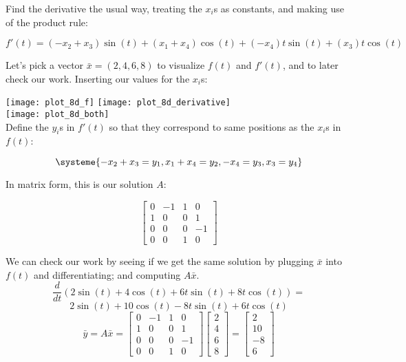 \documentclass[12pt]{article}
\begin{document}
Find the derivative the usual way, treating the $x_i$s as constants, and making use of the product
rule:

\[
f'(t) = (-x_2 + x_3)\sin(t) + (x_1 + x_4)\cos(t) + (-x_4)t\sin(t) + (x_3)t\cos(t)
\]

Let's pick a vector $\bar{x}=(2,4,6,8)$ to visualize $f(t)$ and $f'(t)$, and to later check our
work. Inserting our values for the $x_i$s:

\texttt{[image: plot\_8d\_f]} \texttt{[image: plot\_8d\_derivative]} \\
\texttt{[image: plot\_8d\_both]} \\
\newpage
Define the $y_i$s in $f'(t)$ so that they correspond to same positions as the $x_i$s in $f(t)$:

\[
\systeme{-x_2 + x_3 = y_1, x_1 + x_4 = y_2, -x_4 = y_3,x_3 = y_4}
\]

In matrix form, this is our solution $A$:

\[
\begin{bmatrix}
  0 & -1 & 1 & 0 \\
  1 & 0 & 0 & 1 \\
  0 & 0 & 0 & -1 \\
  0 & 0 & 1 & 0 
\end{bmatrix}
\]

We can check our work by seeing if we get the same solution by plugging
$\bar{x}$ into $f(t)$ and differentiating; and computing $A\bar{x}$. 
\[
  \frac{d}{dt}(2\sin(t)+4\cos(t)+6t\sin(t)+8t\cos(t)) = 
\]
\[
  2\sin(t)+10\cos(t)-8t\sin(t)+6t\cos(t)
\]
\bigbreak{}
\[
  \bar{y} = A\bar{x} = 
  \begin{bmatrix}
    0 & -1 & 1 & 0 \\
    1 & 0 & 0 & 1 \\
    0 & 0 & 0 & -1 \\
    0 & 0 & 1 & 0 
  \end{bmatrix}
  \begin{bmatrix} 2 \\ 4 \\ 6 \\ 8\end{bmatrix} = 
  \begin{bmatrix} 2 \\ 10 \\ -8 \\ 6 \end{bmatrix}
\]

\newpage
\end{document}
